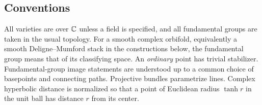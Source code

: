 \subsection{Conventions}
All varieties are over $\mathbb C$ unless a field is specified, and all
fundamental groups are taken in the usual topology.  For a smooth
complex orbifold, equivalently a smooth Deligne--Mumford stack in the
constructions below, the fundamental group means that of its
classifying space.  An \emph{ordinary} point has trivial stabilizer.
Fundamental-group image statements are understood up to a common
choice of basepoints and connecting paths.  Projective bundles
parametrize lines.  Complex hyperbolic distance is normalized so that
a point of Euclidean radius $\tanh r$ in the unit ball has distance
$r$ from its center.

